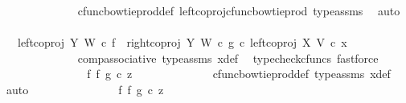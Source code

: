 \begin{isabellebody}
\ \ \ \ \ \ \ \ \ \ \ \ \isamarkupfalse%
\ cfunc{\isacharunderscore}{\kern0pt}bowtie{\isacharunderscore}{\kern0pt}prod{\isacharunderscore}{\kern0pt}def{}\ left{\isacharunderscore}{\kern0pt}coproj{\isacharunderscore}{\kern0pt}cfunc{\isacharunderscore}{\kern0pt}bowtie{\isacharunderscore}{\kern0pt}prod\ type{\isacharunderscore}{\kern0pt}assms\ \isamarkupfalse%
\ auto\isanewline
\ \ \ \ \ \ \ \ \ \ \isamarkupfalse%
\ \isamarkupfalse%
\ {\isachardoublequoteopen}{\isachardot}{\kern0pt}{\isachardot}{\kern0pt}{\isachardot}{\kern0pt}\ {\isacharequal}{\kern0pt}\ {\isacharparenleft}{\kern0pt}{\isacharparenleft}{\kern0pt}left{\isacharunderscore}{\kern0pt}coproj\ Y\ W\ {\isasymcirc}\isactrlsub c\ f{\isacharparenright}{\kern0pt}\ {\isasymamalg}\ {\isacharparenleft}{\kern0pt}right{\isacharunderscore}{\kern0pt}coproj\ Y\ W\ {\isasymcirc}\isactrlsub c\ g{\isacharparenright}{\kern0pt}{\isacharparenright}{\kern0pt}\ {\isasymcirc}\isactrlsub c\ left{\isacharunderscore}{\kern0pt}coproj\ X\ V\ {\isasymcirc}\isactrlsub c\ x{}{\isachardoublequoteclose}\isanewline
\ \ \ \ \ \ \ \ \ \ \ \ \isamarkupfalse%
\ comp{\isacharunderscore}{\kern0pt}associative{}\ type{\isacharunderscore}{\kern0pt}assms\ x{}{\isacharunderscore}{\kern0pt}def\ \isamarkupfalse%
\ {\isacharparenleft}{\kern0pt}typecheck{\isacharunderscore}{\kern0pt}cfuncs{\isacharcomma}{\kern0pt}\ fastforce{\isacharparenright}{\kern0pt}\isanewline
\ \ \ \ \ \ \ \ \ \ \isamarkupfalse%
\ \isamarkupfalse%
\ {\isachardoublequoteopen}{\isachardot}{\kern0pt}{\isachardot}{\kern0pt}{\isachardot}{\kern0pt}\ {\isacharequal}{\kern0pt}\ {\isacharparenleft}{\kern0pt}f\ {\isasymbowtie}\isactrlsub f\ g{\isacharparenright}{\kern0pt}\ {\isasymcirc}\isactrlsub c\ z{}{\isachardoublequoteclose}\isanewline
\ \ \ \ \ \ \ \ \ \ \ \ \isamarkupfalse%
\ cfunc{\isacharunderscore}{\kern0pt}bowtie{\isacharunderscore}{\kern0pt}prod{\isacharunderscore}{\kern0pt}def{}\ type{\isacharunderscore}{\kern0pt}assms\ x{}{\isacharunderscore}{\kern0pt}def\ \isamarkupfalse%
\ auto\isanewline
\ \ \ \ \ \ \ \ \ \ \isamarkupfalse%
\ \isamarkupfalse%
\ {\isachardoublequoteopen}{\isachardot}{\kern0pt}{\isachardot}{\kern0pt}{\isachardot}{\kern0pt}\ {\isacharequal}{\kern0pt}\ {\isacharparenleft}{\kern0pt}f\ {\isasymbowtie}\isactrlsub f\ g{\isacharparenright}{\kern0pt}\ {\isasymcirc}\isactrlsub c\ z{}{\isachardoublequoteclose}\isanewline

\end{isabellebody}
